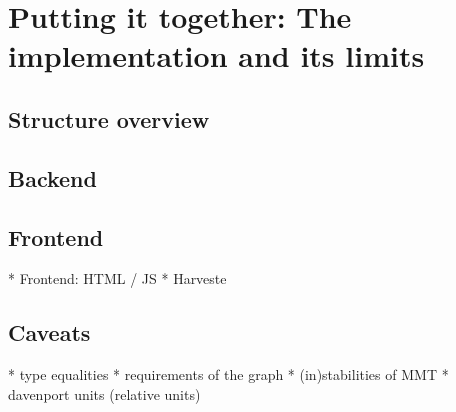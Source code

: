 \section{Putting it together: The implementation and its limits}
\label{sec:pit}

\subsection{Structure overview}
\subsection{Backend}
\subsection{Frontend}
\label{sec:frontend}
* Frontend: HTML / JS
* Harveste
\subsection{Caveats}
* type equalities
* requirements of the graph
* (in)stabilities of MMT
* davenport units (relative units)
